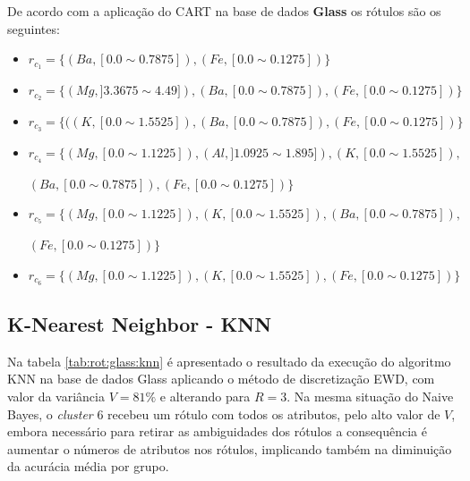 De acordo com a aplicação do CART na base de dados \textbf{Glass} os rótulos são os seguintes:
\begin{itemize}[noitemsep]
 \item ${r_{c_1}=\{ (Ba,[ 0.0 \sim 0.7875 ] ),(Fe,[ 0.0 \sim 0.1275 ] ) \} }$  
 \item ${r_{c_2}=\{ (Mg,] 3.3675 \sim  4.49 ] ),(Ba,[ 0.0 \sim 0.7875 ] ),(Fe,[ 0.0 \sim 0.1275 ] ) \} }$
 \item ${r_{c_3}=\{ ((K,[ 0.0 \sim 1.5525 ] ),(Ba,[ 0.0 \sim 0.7875 ] ),(Fe,[ 0.0 \sim 0.1275 ] )  \} }$  
 \item ${r_{c_4}=\{ (Mg,[ 0.0 \sim  1.1225 ] ),(Al,] 1.0925 \sim 1.895 ] ), (K,[ 0.0 \sim 1.5525 ] ),}$

 ${ (Ba,[ 0.0 \sim 0.7875 ] ),(Fe,[ 0.0 \sim 0.1275 ] ) \} }$
 \item ${r_{c_5}=\{ (Mg,[ 0.0 \sim  1.1225 ] ), (K,[ 0.0 \sim 1.5525 ]  ),(Ba,[ 0.0 \sim 0.7875 ] ), }$
 
 ${ (Fe,[ 0.0 \sim 0.1275 ] ) \} }$
 \item ${r_{c_6}=\{ (Mg,[ 0.0 \sim  1.1225  ] ),  (K,[ 0.0 \sim 1.5525] ),(Fe,[ 0.0 \sim 0.1275 ] ) \} }$
\end{itemize}



\subsection{K-Nearest Neighbor - KNN} \label{cap:resultados:ssec:glass:knn}


Na tabela \ref{tab:rot:glass:knn} é apresentado o resultado da execução do algoritmo KNN na base de dados Glass aplicando o método de discretização EWD, com valor da variância ${V=81\%}$ e alterando para ${R=3}$. Na mesma situação do Naive Bayes, o \textit{cluster} 6 recebeu um rótulo com todos os atributos, pelo alto valor de ${V}$, embora necessário para retirar as ambiguidades dos rótulos a consequência é aumentar o números de atributos nos rótulos, implicando também na diminuição da acurácia média por grupo. 

